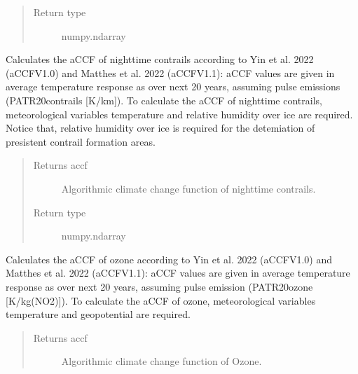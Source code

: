 \documentclass[a4paper,11pt,english]{sphinxmanual}
\begin{document}
\begin{fulllineitems}
\begin{fulllineitems}
\begin{quote}
\begin{description}
\item[{Return type}] \leavevmode
numpy.ndarray

\end{description}\end{quote}

\end{fulllineitems}


\begin{fulllineitems}
\label{\detokenize{modules:envlib.accf.GeTaCCFs.accf_ncontrail}}
Calculates the aCCF of night\sphinxhyphen{}time contrails according to Yin et al. 2022 (aCCF\sphinxhyphen{}V1.0) and Matthes et al. 2022 (aCCF\sphinxhyphen{}V1.1): aCCF values are  given in average 
temperature response as over next 20 years, assuming pulse emissions (P\sphinxhyphen{}ATR20\sphinxhyphen{}contrails {[}K/km{]}). To calculate the aCCF of night\sphinxhyphen{}time contrails,
meteorological variables temperature and relative humidity over ice are required. Notice that,
relative humidity over ice is required for the detemiation of presistent contrail formation areas.
\begin{quote}\begin{description}
\item[{Returns accf}] \leavevmode
Algorithmic climate change function of nighttime contrails.

\item[{Return type}] \leavevmode
numpy.ndarray

\end{description}\end{quote}

\end{fulllineitems}


\begin{fulllineitems}
\label{\detokenize{modules:envlib.accf.GeTaCCFs.accf_o3}}
Calculates the aCCF of ozone according to Yin et al. 2022 (aCCF\sphinxhyphen{}V1.0) and Matthes et al. 2022 (aCCF\sphinxhyphen{}V1.1): aCCF values are  given in 
average temperature response as over next 20 years, assuming pulse emission (P\sphinxhyphen{}ATR20\sphinxhyphen{}ozone {[}K/kg(NO2){]}). To calculate the aCCF of ozone, 
meteorological variables temperature and geopotential are required.
\begin{quote}\begin{description}
\item[{Returns accf}] \leavevmode
Algorithmic climate change function of Ozone.


\end{description}
\end{quote}
\end{fulllineitems}
\end{fulllineitems}
\end{document}
